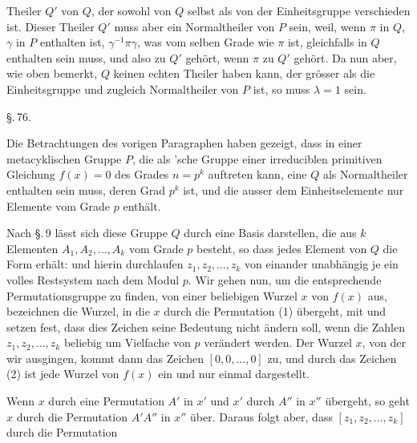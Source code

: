 Theiler $Q'$ von $Q$, der sowohl von $Q$ selbst als von der Einheitsgruppe verschieden ist. Dieser Theiler $Q'$ muss aber ein Normaltheiler von $P$ sein, weil, wenn $\pi$ in $Q$, $\gamma$ in $P$ enthalten ist, $\gamma^{-1}\pi\gamma$, was vom selben Grade wie $\pi$ ist, gleichfalls in $Q$ enthalten sein muss, und also zu $Q'$ geh\"ort, wenn $\pi$ zu $Q'$ geh\"ort. Da nun aber, wie oben bemerkt, $Q$ keinen echten Theiler haben kann, der gr\"osser als die Einheitsgruppe und zugleich Normaltheiler von $P$ ist, so muss $\lambda = 1$ sein.

\begin{center}
\S.\,76.\\
\end{center}

Die Betrachtungen des vorigen Paragraphen haben gezeigt, dass in einer metacyklischen Gruppe $P$, die als 'sche Gruppe einer irreduciblen primitiven Gleichung $f(x) = 0$ des Grades $n = p^k$ auftreten kann, eine  $Q$ als Normaltheiler enthalten sein muss, deren Grad $p^k$ ist, und die ausser dem Einheitselemente nur Elemente vom Grade $p$ enth\"alt.

Nach \S.\,9 l\"asst sich diese Gruppe $Q$ durch eine Basis darstellen, die aus $k$ Elementen $A_1, A_2, \ldots, A_k$ vom Grade $p$ besteht, so dass jedes Element von $Q$ die Form erh\"alt:
und hierin durchlaufen $z_1, z_2, \ldots, z_k$ von einander unabh\"angig je ein volles Restsystem nach dem Modul $p$. Wir gehen nun, um die entsprechende Permutationsgruppe zu finden, von einer beliebigen Wurzel $x$ von $f(x)$ aus, bezeichnen die Wurzel, in die $x$ durch die Permutation (1) \"ubergeht, mit
und setzen fest, dass dies Zeichen seine Bedeutung nicht \"andern soll, wenn die Zahlen $z_1, z_2, \ldots, z_k$ beliebig um Vielfache von $p$ ver\"andert werden. Der Wurzel $x$, von der wir ausgingen, kommt dann das Zeichen $[0, 0, \ldots, 0]$ zu, und durch das Zeichen (2) ist jede Wurzel von $f(x)$ ein und nur einmal dargestellt.

Wenn $x$ durch eine Permutation $A'$ in $x'$ und $x'$ durch $A''$ in $x''$ \"ubergeht, so geht $x$ durch die Permutation $A' A''$ in $x''$ \"uber. Daraus folgt aber, dass $[z_1, z_2, \ldots, z_k]$ durch die Permutation
